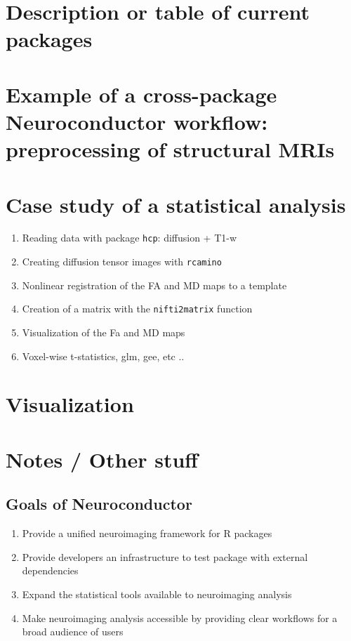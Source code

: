 \documentclass[]{elsarticle} %
\providecommand{\tightlist}{%
  \setlength{\itemsep}{0pt}\setlength{\parskip}{0pt}}
\begin{document}
\section{Description or table of current packages}

\section{Example of a cross-package Neuroconductor workflow: preprocessing of structural MRIs}

\section{Case study of a statistical analysis}

\begin{enumerate}
\item Reading data with package \texttt{hcp}: diffusion + T1-w
\item Creating diffusion tensor images with \texttt{rcamino} 
\item Nonlinear registration of the FA and MD maps to a template
\item Creation of a matrix with the \texttt{nifti2matrix} function
\item Visualization of the Fa and MD maps
\item Voxel-wise t-statistics, glm, gee, etc .. 
\end{enumerate}



\section{Visualization}


\section{Notes / Other stuff}

\subsection{Goals of Neuroconductor}\label{goals-of-neuroconductor}

\begin{enumerate}
\def\labelenumi{\arabic{enumi}.}
\tightlist
\item
  Provide a unified neuroimaging framework for R packages
\item
  Provide developers an infrastructure to test package with external
  dependencies
\item
  Expand the statistical tools available to neuroimaging analysis
\item
  Make neuroimaging analysis accessible by providing clear workflows for
  a broad audience of users
\end{enumerate}
\end{document}
